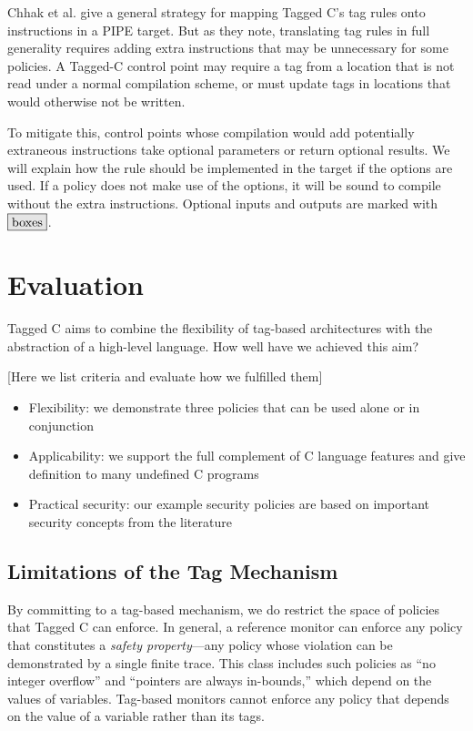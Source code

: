 \documentclass{llncs}
\begin{document}
Chhak et al. \cite{Chhak21:Tagine} give a general strategy for mapping Tagged C's tag rules
onto instructions in a PIPE target. But as they note, translating tag rules in full generality
requires adding extra instructions that may be unnecessary for some policies. A Tagged-C control point
may require a tag from a location that is not read under a normal compilation scheme, or must update tags
in locations that would otherwise not be written.

To mitigate this, control points whose compilation would add potentially extraneous instructions
take optional parameters or return optional results. We will explain how the rule should be
implemented in the target if the options are used. If a policy does not make use of the options, it will
be sound to compile without the extra instructions. Optional inputs
and outputs are marked with \(\optional{boxes}\).

\section{Evaluation}
\label{sec:evaluation}

Tagged C aims to combine the flexibility of tag-based architectures with the abstraction
of a high-level language. How well have we achieved this aim?

[Here we list criteria and evaluate how we fulfilled them]

\begin{itemize}
\item Flexibility: we demonstrate three policies that can be used alone or in conjunction
\item Applicability: we support the full complement of C language features and give definition
  to many undefined C programs
\item Practical security: our example security policies are based on important security concepts
  from the literature
\end{itemize}

\subsection{Limitations of the Tag Mechanism}

By committing to a tag-based mechanism, we do restrict the space of policies that Tagged C
can enforce. In general, a reference monitor can enforce any policy that constitutes a
{\em safety property}---any policy whose violation can be demonstrated by a single finite
trace. This class includes such policies as ``no integer overflow'' and ``pointers are always in-bounds,''
which depend on the values of variables. Tag-based monitors cannot enforce any policy that
depends on the value of a variable rather than its tags.
\end{document}
